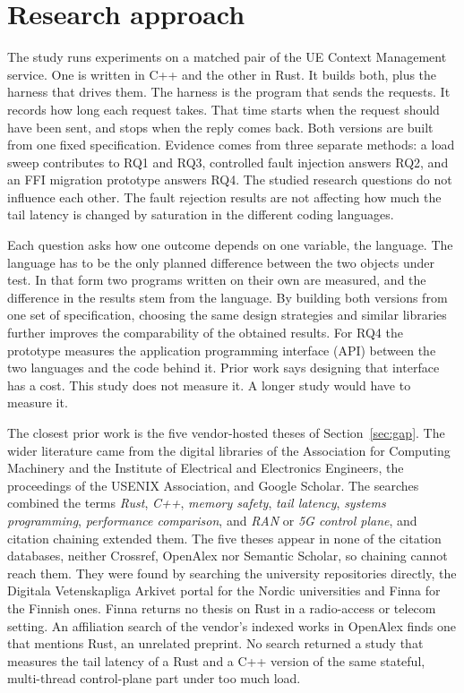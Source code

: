\documentclass[english,oneside,a4paper,censored,csm,software-track-2020]{HYthesisML}
\begin{document}
\FloatBarrier
      
\section{Research approach}\label{sec:approach}
The study runs experiments on a matched pair of the UE Context Management service.
One is written in C++ and the other in Rust. It builds both, plus the harness
that drives them. The harness is the program that sends the requests. It records
how long each request takes. That time starts when the request should have been
sent, and stops when the reply comes back. Both versions are built from one
fixed specification. Evidence comes from three separate methods: a load sweep contributes to
RQ1 and RQ3, controlled fault injection answers RQ2, and an FFI migration
prototype answers RQ4. The studied research questions do not influence each other. 
The fault rejection results are not affecting how much the tail latency is changed 
by saturation in the different coding languages. 


Each question asks how one outcome depends on one variable, the language. The
language has to be the only planned difference between the two objects under test. 
In that form two programs written on their own are measured, and the difference in the results stem from the language. 
By building both versions from one set of specification, choosing the same design strategies and similar libraries further 
improves the comparability of the obtained results.
For RQ4 the prototype measures the application programming
interface (API) between the two languages and the code behind it. Prior work
says designing that interface has a cost. This study does not measure it. A
longer study would have to measure it.

The closest prior work is the five vendor-hosted theses of Section~\ref{sec:gap}.
The wider literature came from the digital libraries of the Association for Computing
Machinery and the Institute of Electrical and Electronics Engineers, the proceedings of the
USENIX Association, and Google Scholar. The searches combined the terms \emph{Rust},
\emph{C++}, \emph{memory safety}, \emph{tail latency}, \emph{systems programming},
\emph{performance comparison}, and \emph{RAN} or \emph{5G control plane}, and citation
chaining extended them. The five theses appear in none of the citation databases, neither
Crossref, OpenAlex nor Semantic Scholar, so chaining cannot reach them. They were found by
searching the university repositories directly, the Digitala Vetenskapliga Arkivet portal for
the Nordic universities and Finna for the Finnish ones. Finna returns no thesis on Rust in
a radio-access or telecom setting. An affiliation search of the vendor's indexed works in
OpenAlex finds one that mentions Rust, an unrelated preprint. No search returned a study
that measures the tail latency of a Rust and a C++ version of the same stateful, multi-thread
control-plane part under too much load.
\end{document}
